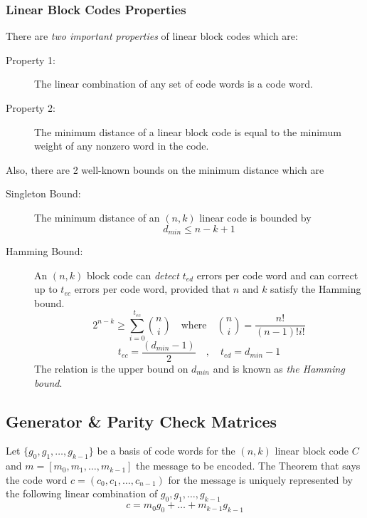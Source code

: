 \subsubsection{Linear Block Codes Properties}
There are \emph{two important properties} of linear block codes which are:
\begin{description}
    \item[Property 1:] The linear combination of any set of code words is a code word.
    \item[Property 2:] The minimum distance of a linear block code is equal to the minimum weight of any nonzero word in the code.
\end{description}
Also, there are 2 well-known bounds on the minimum distance which are
\begin{description}
    \item[Singleton Bound:]
    The minimum distance of an $(n, k)$ linear code is bounded by
    \begin{equation}
        \label{eq:Singleton Bound}
        d_{min} \leq n-k+1
    \end{equation}
    \item[Hamming Bound:]
    An $(n, k)$ block code can \emph{detect} $t_{ed}$ errors per code word and can correct up to $t_{ec}$ errors per code word, provided that $n$ and $k$ satisfy the Hamming bound.
    \begin{equation}
        \label{eq:Hamming Bound}
        2^{n-k} \geq \sum_{i = 0}^{t_{ec}} \binom{n}{i} \quad \text{where} \quad \binom{n}{i} = \frac{n!}{(n-1)!i!}
    \end{equation}
    \[ t_{ec} = \frac{(d_{min} - 1)}{2} \quad , \quad t_{ed} = d_{min} - 1  \]
    The relation is the upper bound on $d_{min}$ and is known as \emph{the Hamming bound}.
\end{description}
 
\subsection{Generator \& Parity Check Matrices}
Let $\{g_0, g_1, \ldots  , g_{k-1}\}$ be a basis of code words for the $(n, k)$ linear block code $C$ and $m = [m_0, m_1, \ldots , m_{k-1}]$ the message to be encoded. The Theorem that says the code word $c = (c_0, c_1, \ldots , c_{n-1})$ for the message is uniquely represented by the following linear combination of $g_0, g_1, \ldots , g_{k-1}$
\[ c = m_0g_0 + \ldots + m_{k-1}g_{k-1} \]

